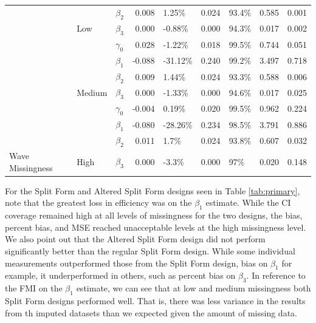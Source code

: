 \documentclass{svjour3}\usepackage[]{graphicx}\usepackage[]{color}
\newenvironment{knitrout}{}{} %
\begin{document}
\begin{knitrout}
\begin{table}[!h]
{\begin{tabular}[t]{l|l|l|r|l|r|l|r|r}
 &  & $\beta_2$ & 0.008 & 1.25\% & 0.024 & 93.4\% & 0.585 & 0.001\\

 & \multirow{-4}{*}{\raggedright\arraybackslash Low} & $\beta_3$ & 0.000 & -0.88\% & 0.000 & 94.3\% & 0.017 & 0.002\\

 &  & $\gamma_0$ & 0.028 & -1.22\% & 0.018 & 99.5\% & 0.744 & 0.051\\

 &  & $\beta_1$ & -0.088 & -31.12\% & 0.240 & 99.2\% & 3.497 & 0.718\\

 &  & $\beta_2$ & 0.009 & 1.44\% & 0.024 & 93.3\% & 0.588 & 0.006\\

 & \multirow{-4}{*}{\raggedright\arraybackslash Medium} & $\beta_3$ & 0.000 & -1.33\% & 0.000 & 94.6\% & 0.017 & 0.025\\

 &  & $\gamma_0$ & -0.004 & 0.19\% & 0.020 & 99.5\% & 0.962 & 0.224\\

 &  & $\beta_1$ & -0.080 & -28.26\% & 0.234 & 98.5\% & 3.791 & 0.886\\

 &  & $\beta_2$ & 0.011 & 1.7\% & 0.024 & 93.8\% & 0.607 & 0.032\\

\multirow{-12}{*}{\raggedright\arraybackslash Wave Missingness} & \multirow{-4}{*}{\raggedright\arraybackslash High} & $\beta_3$ & 0.000 & -3.3\% & 0.000 & 97\% & 0.020 & 0.148\\
\hline
\end{tabular}}
\end{table}


\end{knitrout}

For the Split Form and Altered Split Form designs seen in Table \ref{tab:primary}, note that the greatest loss in efficiency was on the $\beta_1$ estimate. While the CI coverage remained high at all levels of missingness for the two designs, the bias, percent bias, and MSE reached unacceptable levels at the high missingness level. We also point out that the Altered Split Form design did not perform significantly better than the regular Split Form design. While some individual measurements outperformed those from the Split Form design, bias on $\beta_1$ for example, it underperformed in others, such as percent bias on $\beta_3$. In reference to the FMI on the $\beta_1$ estimate, we can see that at low and medium missingness both Split Form designs performed well. That is, there was less variance in the results from th imputed datasets than we expected given the amount of missing data.\par
\end{document}
